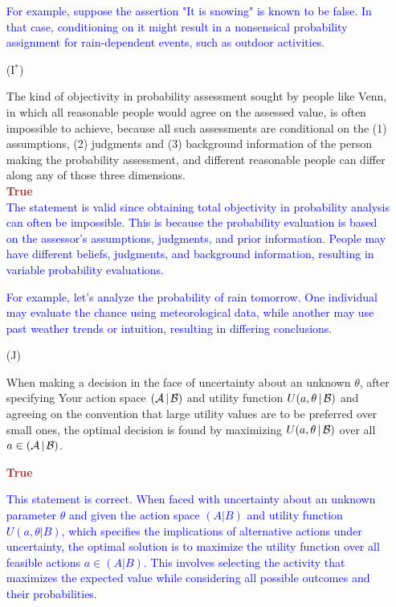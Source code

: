 \documentclass[12pt]{article}
\newcommand{\given}{\, | \,}
\begin{document}
\begin{itemize}
\textcolor{blue}{For example, suppose the assertion "It is snowing" is known to be false. In that case, conditioning on it might result in a nonsensical probability assignment for rain-dependent events, such as outdoor activities.}


\item[(I$^*$)]

The kind of objectivity in probability assessment sought by people like
Venn, in which all reasonable people would agree on the assessed value, is
often impossible to achieve, because all such assessments are conditional
on the (1) assumptions, (2) judgments and (3) background information of the
person making the probability assessment, and different reasonable people
can differ along any of those three dimensions.\\
\textcolor{brown}{\textbf{True}} \\
\textcolor{blue}{The statement is valid since obtaining total objectivity in probability analysis can often be impossible. This is because the probability evaluation is based on the assessor's assumptions, judgments, and prior information. People may have different beliefs, judgments, and background information, resulting in variable probability evaluations.}

\textcolor{blue}{For example, let's analyze the probability of rain tomorrow. One individual may evaluate the chance using meteorological data, while another may use past weather trends or intuition, resulting in differing conclusions.}


\item[(J)]

When making a decision in the face of uncertainty about an unknown $\theta$, after specifying Your action space $( { \cal A } \given { \cal B } )$ and utility function $U ( a, \theta \given { \cal B } )$ and agreeing on the convention that large utility values are to be preferred over small ones, the optimal decision is found by maximizing $U ( a, \theta \given { \cal B } )$ over all $a \in ( { \cal A } \given { \cal B } )$.

\textcolor{brown}{\textbf{True}}

\textcolor{blue}{This statement is correct. When faced with uncertainty about an unknown parameter $\theta$ and given the action space $(A | B)$ and utility function $U(a, \theta | B)$, which specifies the implications of alternative actions under uncertainty, the optimal solution is to maximize the utility function over all feasible actions $a \in (A | B)$. This involves selecting the activity that maximizes the expected value while considering all possible outcomes and their probabilities.}


\end{itemize}
\end{document}
